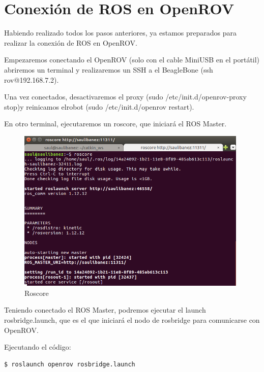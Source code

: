 \section{Conexión de ROS en OpenROV}
\label{cap:Conexion de ROS en OpenROV}

Habiendo realizado todos los pasos anteriores, ya estamos preparados para realizar la conexión de ROS en OpenROV.

Empezaremos conectando el OpenROV (solo con el cable MiniUSB en el portátil) abriremos un terminal y realizaremos un SSH a el BeagleBone (ssh rov@192.168.7.2).

Una vez conectados, desactivaremos el proxy (sudo /etc/init.d/openrov-proxy stop)y reinicamos elrobot (sudo /etc/init.d/openrov restart).

En otro terminal, ejecutaremos un roscore, que iniciará el ROS Master.

\begin{figure} [hbtp]
  \begin{center}
    \includegraphics[width=11cm]{img/cap4/roscore}
  \end{center}
  \caption{Roscore}
  \label{fig:roscore}
\end{figure}
\newpage
Teniendo conectado el ROS Master, podremos ejecutar el launch rosbridge.launch, que es el que iniciará el nodo de rosbridge para comunicarse con OpenROV.

Ejecutando el código:
\begin{lstlisting}[caption=launch, label={lst:launch}]
	$ roslaunch openrov rosbridge.launch
\end{lstlisting}

